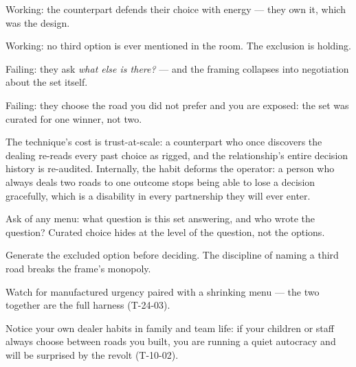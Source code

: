 \begin{feedback}
  \item Working: the counterpart defends their choice with energy --- they own it, which was the design.
  \item Working: no third option is ever mentioned in the room. The exclusion is holding.
  \item Failing: they ask \emph{what else is there?} --- and the framing collapses into negotiation about the set itself.
  \item Failing: they choose the road you did not prefer and you are exposed: the set was curated for one winner, not two.
\end{feedback}
\begin{failure}
The technique's cost is trust-at-scale: a counterpart who once discovers the dealing re-reads every past choice as rigged, and the relationship's entire decision history is re-audited. Internally, the habit deforms the operator: a person who always deals two roads to one outcome stops being able to lose a decision gracefully, which is a disability in every partnership they will ever enter.
\end{failure}
\begin{countermeasures}
  \item Ask of any menu: what question is this set answering, and who wrote the question? Curated choice hides at the level of the question, not the options.
  \item Generate the excluded option before deciding. The discipline of naming a third road breaks the frame's monopoly.
  \item Watch for manufactured urgency paired with a shrinking menu --- the two together are the full harness (T-24-03).
  \item Notice your own dealer habits in family and team life: if your children or staff always choose between roads you built, you are running a quiet autocracy and will be surprised by the revolt (T-10-02).
\end{countermeasures}

\seesources
{}
